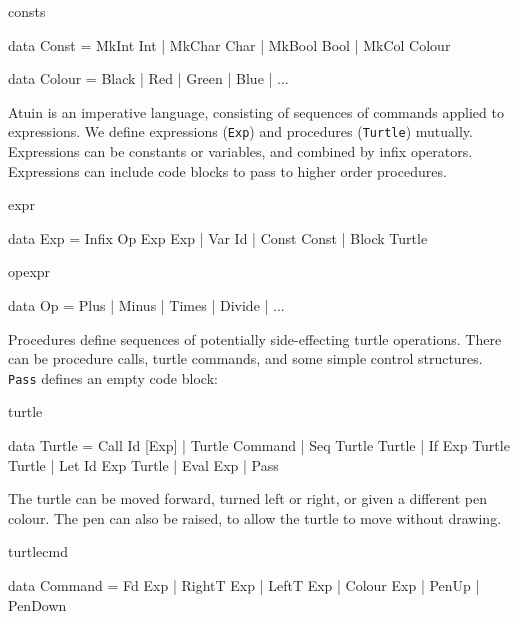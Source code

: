 \begin{SaveVerbatim}{consts}

data Const = MkInt Int   | MkChar Char
           | MkBool Bool | MkCol Colour

data Colour = Black | Red | Green | Blue | ...

\end{SaveVerbatim}

\noindent
Atuin is an imperative language, consisting of sequences of commands
applied to expressions. We define expressions (\texttt{Exp})
and procedures (\texttt{Turtle}) mutually. Expressions can be constants
or variables, and combined by infix operators. Expressions can include
code blocks to pass to higher order procedures.

\begin{SaveVerbatim}{expr}

data Exp = Infix Op Exp Exp | Var Id
         | Const Const      | Block Turtle
\end{SaveVerbatim}

\begin{SaveVerbatim}{opexpr}

data Op = Plus | Minus | Times  | Divide | ...

\end{SaveVerbatim}

\noindent
Procedures define sequences of potentially side-effecting turtle
operations. There can be procedure calls, turtle commands, and some
simple control structures. \texttt{Pass} defines an empty code block:

\begin{SaveVerbatim}{turtle}

data Turtle = Call Id [Exp]     | Turtle Command
            | Seq Turtle Turtle | If Exp Turtle Turtle
            | Let Id Exp Turtle | Eval Exp
            | Pass

\end{SaveVerbatim}

\noindent
The turtle can be moved forward, turned left or right, or given a
different pen colour. The pen can also be raised, to allow the turtle
to move without drawing.

\begin{SaveVerbatim}{turtlecmd}

data Command = Fd Exp     | RightT Exp | LeftT Exp
             | Colour Exp | PenUp      | PenDown

\end{SaveVerbatim}


